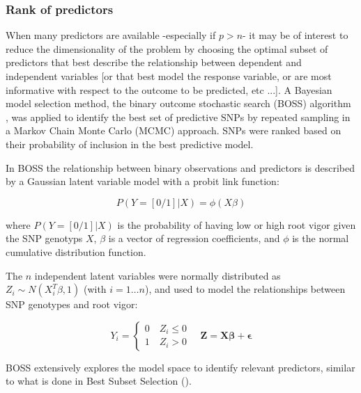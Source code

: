 \subsubsection{Rank of predictors}
\label{par:boss}
When many predictors are available -especially if $p>n$- it may be
of interest to reduce the dimensionality of the problem by choosing the
optimal subset of predictors that best describe the relationship between
dependent and independent variables [or that best model the response
variable, or are most informative with respect to the outcome to be
predicted, etc ...].
A Bayesian model selection method, the binary outcome stochastic search
(BOSS) algorithm \cite{russu2012stochastic}, was applied to identify the best set of predictive
SNPs by repeated sampling in a Markov Chain Monte
Carlo (MCMC) approach.  
SNPs were ranked based on their probability of inclusion in the best
predictive model.
 
In BOSS the relationship between binary observations and predictors is
described by a Gaussian latent variable model with a probit link function:

\begin{equation}
P(Y=[0/1]|X)=\phi(X \beta)
\label{eq:probit}
\end{equation} 

where $P(Y=[0/1]|X)$ is the probability of having low or high root vigor
given the SNP genotyps $X$, $\beta$ is a vector of regression
coefficients, and $\phi$ is the normal cumulative distribution function. 

The $n$ independent latent variables were normally distributed as $Z_i \sim
N(X_i^T\beta,1)$ (with $i=1 \ldots n$), and used to model the relationships between SNP genotypes and root vigor:

\begin{equation}
Y_i = \left\{ 
\begin{array}{ll}
0 \quad Z_i \leq 0 \\
1 \quad Z_i > 0
\end{array}
\right.
\quad \mathbf{Z}=\mathbf{X\beta+\epsilon}
\label{eq:threshold}
\end{equation}

BOSS extensively explores the model space to identify relevant
predictors, similar to what is done in Best Subset Selection (\cite{hastie2009model}).

